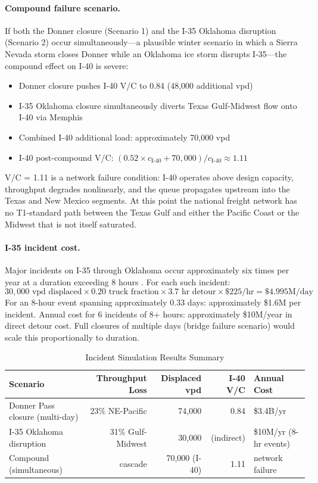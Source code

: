 \paragraph{Compound failure scenario.} If both the Donner closure (Scenario 1) and the I-35 Oklahoma disruption (Scenario 2) occur simultaneously---a plausible winter scenario in which a Sierra Nevada storm closes Donner while an Oklahoma ice storm disrupts I-35---the compound effect on I-40 is severe:
\begin{itemize}
  \item Donner closure pushes I-40 V/C to 0.84 (48,000 additional vpd)
  \item I-35 Oklahoma closure simultaneously diverts Texas Gulf-Midwest flow onto I-40 via Memphis
  \item Combined I-40 additional load: approximately 70,000 vpd
  \item I-40 post-compound V/C: $(0.52 \times c_\text{I-40} + 70{,}000) / c_\text{I-40} \approx 1.11$
\end{itemize}
V/C = 1.11 is a network failure condition: I-40 operates above design capacity, throughput degrades nonlinearly, and the queue propagates upstream into the Texas and New Mexico segments. At this point the national freight network has no T1-standard path between the Texas Gulf and either the Pacific Coast or the Midwest that is not itself saturated.

\paragraph{I-35 incident cost.} Major incidents on I-35 through Oklahoma occur approximately six times per year at a duration exceeding 8 hours \citep{FHWA_freight2023}. For each such incident:
\begin{equation}
  30{,}000 \text{ vpd displaced} \times 0.20 \text{ truck fraction} \times 3.7 \text{ hr detour} \times \$225/\text{hr} = \$4.995\text{M/day}
\end{equation}
For an 8-hour event spanning approximately 0.33 days: approximately \$1.6M per incident. Annual cost for 6 incidents of 8+ hours: approximately \$10M/year in direct detour cost. Full closures of multiple days (bridge failure scenario) would scale this proportionally to duration.

\begin{table}[ht]
\centering
\caption{Incident Simulation Results Summary}
\label{tab:incidents}
\begin{tabular}{lrrrl}
\toprule
Scenario & Throughput Loss & Displaced vpd & I-40 V/C & Annual Cost \\
\midrule
Donner Pass closure (multi-day) & 23\% NE-Pacific & 74,000 & 0.84 & \$3.4B/yr \\
I-35 Oklahoma disruption & 31\% Gulf-Midwest & 30,000 & (indirect) & \$10M/yr (8-hr events) \\
Compound (simultaneous) & cascade & 70,000 (I-40) & 1.11 & network failure \\
\bottomrule
\end{tabular}
\end{table}

